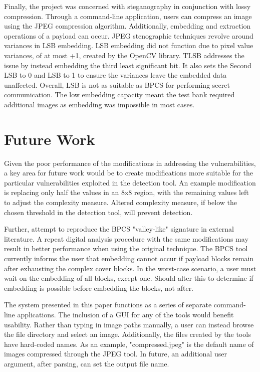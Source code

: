 \documentclass{l4proj}
\begin{document}
Finally, the project was concerned with steganography in conjunction with lossy compression. Through a command-line application, users can compress an image using the JPEG compression algorithm. Additionally, embedding and extraction operations of a payload can occur. JPEG stenographic techniques revolve around variances in LSB embedding. LSB embedding did not function due to pixel value variances, of at most +1, created by the OpenCV library. TLSB addresses the issue by instead embedding the third least significant bit. It also sets the Second LSB to 0 and LSB to 1 to ensure the variances leave the embedded data unaffected. Overall, LSB is not as suitable as BPCS for performing secret communication. The low embedding capacity meant the test bank required additional images as embedding was impossible in most cases.


\section{Future Work}

Given the poor performance of the modifications in addressing the vulnerabilities, a key area for future work would be to create modifications more suitable for the particular vulnerabilities exploited in the detection tool. An example modification is replacing only half the values in an 8x8 region, with the remaining values left to adjust the complexity measure. Altered complexity measure, if below the chosen threshold in the detection tool, will prevent detection.

Further, attempt to reproduce the BPCS "valley-like" signature in external literature. A repeat digital analysis procedure with the same modifications may result in better performance when using the original technique. The BPCS tool currently informs the user that embedding cannot occur if payload blocks remain after exhausting the complex cover blocks. In the worst-case scenario, a user must wait on the embedding of all blocks, except one. Should alter this to determine if embedding is possible before embedding the blocks, not after.

The system presented in this paper functions as a series of separate command-line applications. The inclusion of a GUI for any of the tools would benefit usability. Rather than typing in image paths manually, a user can instead browse the file directory and select an image. Additionally, the files created by the tools have hard-coded names. As an example, "compressed.jpeg" is the default name of images compressed through the JPEG tool. In future, an additional user argument, after parsing, can set the output file name.
\end{document}
